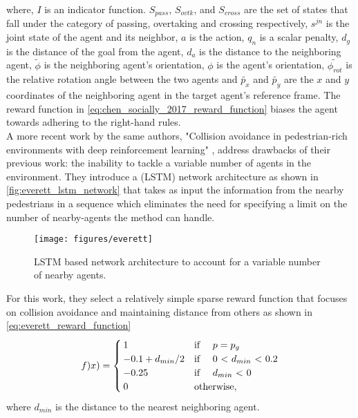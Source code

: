 where, $I$ is an indicator function. $S_{pass}$, $S_{ovtk}$, and $S_{cross}$ are the set of states that fall under the category of passing, overtaking and crossing respectively, $s^{jn}$ is the joint state of the agent and its neighbor, $a$ is the action, $q_{n}$ is a scalar penalty, $d_{g}$ is the distance of the goal from the agent, $d_{a}$ is the distance to the neighboring agent, $\tilde{\phi}$ is the neighboring agent's orientation, $\phi$ is the agent's orientation, $\tilde{\phi_{rot}}$ is the relative rotation angle between the two agents and $\tilde{p_x}$ and $\tilde{p_y}$ are the $x$ and $y$ coordinates of the neighboring agent in the target agent's reference frame. The reward function in \autoref{eq:chen_socially_2017_reward_function} biases the agent towards adhering to the right-hand rules.
\\

A more recent work by the same authors, "Collision avoidance in pedestrian-rich environments with deep reinforcement learning" \cite{everett_collision_2019}, 
address drawbacks of their previous work: the inability to tackle a variable number of agents in the environment. They introduce a  (LSTM) \cite{hochreiterLongShortTermMemory1997} network architecture as shown in \autoref{fig:everett_lstm_network} that takes as input the information from the nearby pedestrians in a sequence which eliminates the need for specifying a limit on the number of nearby-agents the method can handle.
\begin{figure}[!htbp]
	\centering
	\texttt{[image: figures/everett]}
	\caption{LSTM based network architecture to account for a variable number of nearby agents.}
	\label{fig:everett_lstm_network}
\end{figure}
 For this work, they select a relatively simple sparse reward function that focuses on collision avoidance and maintaining distance from others as shown in \autoref{eq:everett_reward_function}\\
\begin{align}
\label{eq:everett_reward_function}
f)x) = 
\begin{cases}
	 1 & \text{if \quad $p=p_g$} \\
	 -0.1+d_{min}/2 & \text{if \quad 0 < $d_{min}$ < 0.2} \\
	 -0.25 & \text{if \quad $d_{min}$ < 0}\\
	 0 & \text{otherwise}, 
\end{cases}
\end{align}
where $d_{min}$ is the distance to the nearest neighboring agent.

